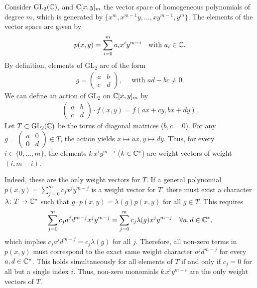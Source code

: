 \documentclass[11pt]{amsart}
\begin{document}
\begin{eg}\label{ex:siamese}
Consider $\mathrm{GL}_2(\mathbb{C})$, and $\mathbb{C}[x,y]_m$ the vector space of homogeneous polynomials of degree \(m\), which is generated by \(\{x^m,x^{m-1}y,\dots,xy^{m-1},y^m\}\). The elements of the vector space are given by
\begin{align*}
    p(x,y) = \sum_{i=0}^ma_ix^iy^{m - i} \quad \text{with } a_i \in \mathbb{C}.
\end{align*}
By definition, elements of $\mathrm{GL}_2$ are of the form
\begin{align*}
    g = \begin{pmatrix}
        a & b\\c & d
    \end{pmatrix}, \quad\text{ with } ad - bc \neq 0.
\end{align*}
 We can define an action of $\mathrm{GL}_2$ on $\mathbb{C}[x,y]_m$ by 
 \begin{align}
     \begin{pmatrix}
         a&b\\c&d
     \end{pmatrix} \cdot f(x, y)
     = f(ax + cy, bx + dy). \label{eq:action}
 \end{align}
Let $T \subset \mathrm{GL}_2(\mathbb{C})$ be the torus of diagonal matrices ($b, c = 0$). For any $g = \begin{pmatrix} a & 0 \\ 0 & d \end{pmatrix} \in T$, the action yields $x \mapsto ax, y \mapsto dy$. 
Thus, for every $i \in \{0,\dots,m\}$, the elements $k\,x^iy^{m - i}$ ($k \in \mathbb{C}^*$) are weight vectors of weight $(i, m-i)$. 

Indeed, these are the only weight vectors for $T$. If a general polynomial $p(x,y) = \sum_{j=0}^m c_j x^j y^{m-j}$ is a weight vector for $T$, there must exist a character $\lambda \colon T \to \mathbb{C}^*$ such that $g \cdot p(x,y) = \lambda(g) p(x,y)$ for all $g \in T$. This requires
\begin{align*}
    \sum_{j=0}^m c_j a^j d^{m-j} x^j y^{m-j} = \sum_{j=0}^m c_j \lambda(g) x^j y^{m-j} \quad \forall a, d \in \mathbb{C}^*,
\end{align*}
which implies $c_j a^j d^{m-j} = c_j \lambda(g)$ for all $j$. Therefore, all non-zero terms in $p(x,y)$ must correspond to the exact same weight character $a^j d^{m-j}$ for every $a, d \in \mathbb{C}^*$. This holds simultaneously for all elements of $T$ if and only if $c_j = 0$ for all but a single index $i$. Thus, non-zero monomials $k\,x^iy^{m - i}$ are the only weight vectors of $T$.


\end{eg}
\end{document}
